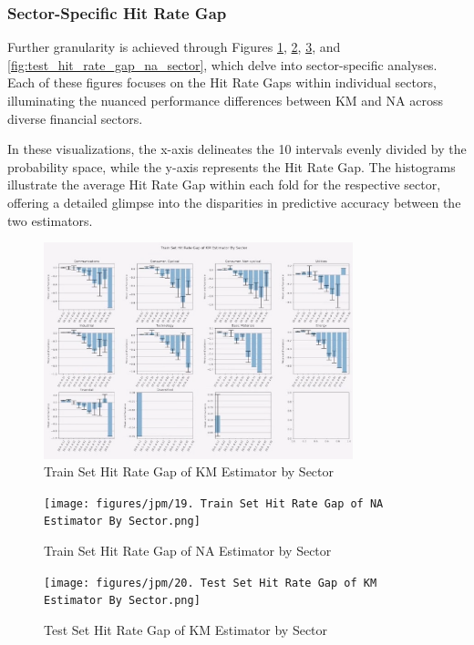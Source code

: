 \subsubsection{Sector-Specific Hit Rate Gap}
Further granularity is achieved through Figures \ref{fig:train_hit_rate_gap_km_sector}, \ref{fig:train_hit_rate_gap_na_sector}, \ref{fig:test_hit_rate_gap_km_sector}, and \ref{fig:test_hit_rate_gap_na_sector}, which delve into sector-specific analyses. Each of these figures focuses on the Hit Rate Gaps within individual sectors, illuminating the nuanced performance differences between KM and NA across diverse financial sectors.

In these visualizations, the x-axis delineates the 10 intervals evenly divided by the probability space, while the y-axis represents the Hit Rate Gap. The histograms illustrate the average Hit Rate Gap within each fold for the respective sector, offering a detailed glimpse into the disparities in predictive accuracy between the two estimators.

\begin{figure}[H]
    \centering
    \includegraphics[width=0.8\textwidth]{figures/jpm/18. Train Set Hit Rate Gap of KM Estimator By Sector.png}
    \caption{Train Set Hit Rate Gap of KM Estimator by Sector}
    \label{fig:train_hit_rate_gap_km_sector}
\end{figure}

\begin{figure}[H]
    \centering
    \texttt{[image: figures/jpm/19. Train Set Hit Rate Gap of NA Estimator By Sector.png]}
    \caption{Train Set Hit Rate Gap of NA Estimator by Sector}
    \label{fig:train_hit_rate_gap_na_sector}
\end{figure}

\begin{figure}[H]
    \centering
    \texttt{[image: figures/jpm/20. Test Set Hit Rate Gap of KM Estimator By Sector.png]}
    \caption{Test Set Hit Rate Gap of KM Estimator by Sector}
    \label{fig:test_hit_rate_gap_km_sector}
\end{figure}

